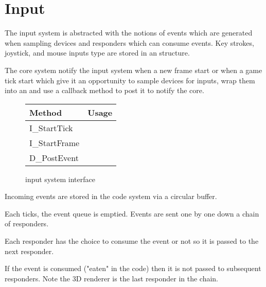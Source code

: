 \section{Input}
The input system is abstracted with the notions of events which are generated when sampling devices and responders which can consume events. Key strokes, joystick, and mouse inputs type are stored in an  structure.\\
\par
{}
\par
The core system notify the input system when a new frame start or when a game tick start which give it an opportunity to sample devices for inputs, wrap them into an  and use a callback method to post it to notify the core.\\
\par
\begin{figure}[H]
\centering  
\begin{tabularx}{\textwidth}{ L{0.6}  L{1.4}}
  \toprule
  \textbf{Method} &  \textbf{Usage}\\
  \toprule 
  I\_StartTick &\\
  I\_StartFrame &\\
  D\_PostEvent & \\
   \toprule
\end{tabularx}
\caption{\doom input system interface}
\end{figure}
\par
Incoming events are stored in the code system via a circular buffer.\\
\par
{}

\par
Each ticks, the event queue is emptied. Events are sent one by one down a chain of responders.\\
\par
{}
\par
 Each responder has the choice to consume the event or not so it is passed to the next responder.\\
 \par If the event is consumed ("eaten" in the code) then it is not passed to subsequent responders. Note the 3D renderer is the last responder in the chain.\\
 

